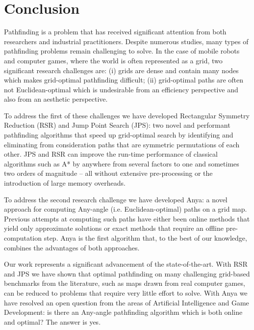 \chapter{Conclusion}
\label{cha::conclusion}

Pathfinding is a problem that has received significant attention from both
researchers and industrial practitioners. Despite numerous studies, many types
of pathfinding problems remain challenging to solve. In the case of
mobile robots and computer games, where the world is often represented as a
grid, two significant research challenges are: (i) grids are dense and
contain many nodes which makes grid-optimal pathfinding difficult; (ii)
grid-optimal paths are often not Euclidean-optimal which is undesirable from
an efficiency perspective and also from an aesthetic perspective.

To address the first of these challenges we have developed Rectangular
Symmetry Reduction (RSR) and Jump Point Search (JPS): two novel and performant
pathfinding algorithms that speed up grid-optimal search by identifying and
eliminating from consideration paths that are symmetric permutations of each
other.  JPS and RSR can improve the run-time performance of classical
algorithms such as A{*} by anywhere from several factors to one and sometimes
two orders of magnitude -- all without extensive pre-processing or the
introduction of large memory overheads.

To address the second research challenge we have developed Anya: a novel
approach for computing Any-angle (i.e. Euclidean-optimal) paths on a grid map.
Previous attempts at computing such paths have either been online methods that
yield only approximate solutions or exact methods that require an offline
pre-computation step.  Anya is the first algorithm that, to the best of our
knowledge, combines the advantages of both approaches.

Our work represents a significant advancement of the state-of-the-art. With
RSR and JPS we have shown that optimal pathfinding on many challenging
grid-based benchmarks from the literature, such as maps drawn from real
computer games, can be reduced to problems that require very little effort to
solve. With Anya we have resolved an open question from the areas of
Artificial Intelligence and Game Development: is there an Any-angle
pathfinding algorithm which is both online and optimal?  The answer is yes.

\newpage
